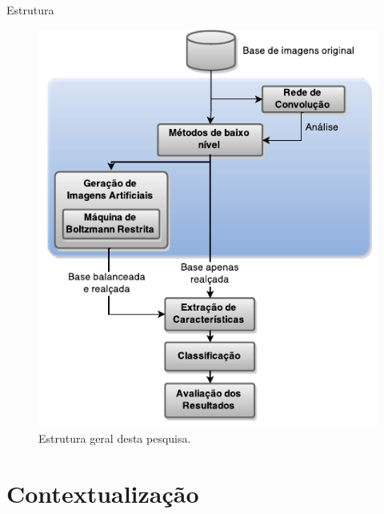 \documentclass{beamer}
\begin{document}
\begin{frame}{Estrutura}
\begin{figure}
    \includegraphics[height=0.75\textheight]{figuras/geral.pdf}
    \caption{Estrutura geral desta pesquisa.}
\end{figure}
\end{frame}
\section{Contextualização}
\end{document}
